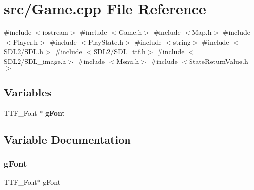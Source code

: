 \section{src/\+Game.cpp File Reference}
\label{_game_8cpp}
{\ttfamily \#include $<$iostream$>$}\newline
{\ttfamily \#include $<$Game.\+h$>$}\newline
{\ttfamily \#include $<$Map.\+h$>$}\newline
{\ttfamily \#include $<$Player.\+h$>$}\newline
{\ttfamily \#include $<$Play\+State.\+h$>$}\newline
{\ttfamily \#include $<$string$>$}\newline
{\ttfamily \#include $<$S\+D\+L2/\+S\+D\+L.\+h$>$}\newline
{\ttfamily \#include $<$S\+D\+L2/\+S\+D\+L\+\_\+ttf.\+h$>$}\newline
{\ttfamily \#include $<$S\+D\+L2/\+S\+D\+L\+\_\+image.\+h$>$}\newline
{\ttfamily \#include $<$Menu.\+h$>$}\newline
{\ttfamily \#include $<$State\+Return\+Value.\+h$>$}\newline
\subsection*{Variables}
\begin{DoxyCompactItemize}
\item 
T\+T\+F\+\_\+\+Font $\ast$ \textbf{ g\+Font}
\end{DoxyCompactItemize}


\subsection{Variable Documentation}
\mbox{\label{_game_8cpp_a88e76957ec56f067af762125afcac25f}} 
\subsubsection{g\+Font}
{\footnotesize\ttfamily T\+T\+F\+\_\+\+Font$\ast$ g\+Font}


